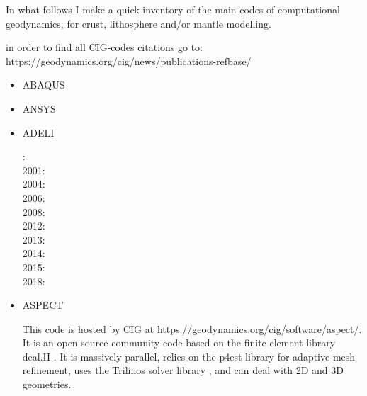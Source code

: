 
In what follows I make a quick inventory of the main codes of computational geodynamics, 
for crust, lithosphere and/or mantle modelling.

in order to find all CIG-codes citations go to: https://geodynamics.org/cig/news/publications-refbase/

\begin{itemize}

\item {\codefont ABAQUS} 

{\small
\noindent
\cite{brry01}
\cite{gedh02}
\cite{fumr03}
\cite{hapf06}
\cite{camg07}
\cite{kuhe09}
\cite{makh09}
\cite{camg10}
\cite{nalr12}
\cite{pevp15}
\cite{naam17}
\cite{naam18}
}

\item {\codefont ANSYS} 

\cite{nehe06}

\item {\codefont ADELI} 

{\small
{}: \cite{hajc97}\\
2001: \cite{chzh01}\\
2004: \cite{gocl04}\\
2006: \cite{vech06}\cite{golc06}\\
2008: \cite{boht08a}\cite{boht08b}\\
2012: \cite{gech12}\cite{gigh12}\\
2013: \cite{wahd13}\\
2014: \cite{cehg14}\\
2015: \cite{ceag15}\\
2018: \cite{cegm18}\cite{gehn18}
}

\item {\codefont ASPECT} 

This code is hosted by CIG at \url{https://geodynamics.org/cig/software/aspect/}. 
It is an open source community code based on the finite element library deal.II \cite{bahk07,arbc19}. 
It is massively parallel, relies on the p4est library for adaptive mesh refinement,
uses the Trilinos solver library \cite{hewi12}, and can deal with 2D and 3D geometries. 


\end{itemize}
